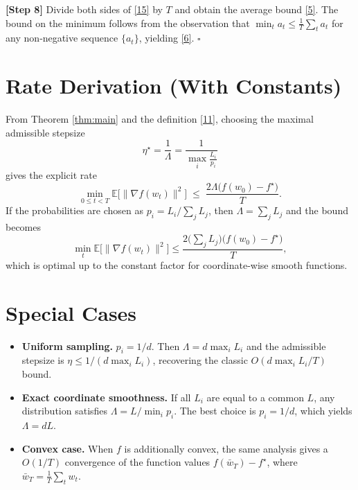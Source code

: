 \documentclass{article}
\newcommand{\E}{\mathbb{E}}
\newcommand{\grad}{\nabla}
\begin{document}
\noindent\textbf{[Step 8]} Divide both sides of \eqref{15} by $T$ and obtain
the average bound \eqref{5}.  The bound on the minimum follows from the
observation that $\min_{t}a_{t}\le\frac{1}{T}\sum_{t}a_{t}$ for any
non‑negative sequence $\{a_{t}\}$, yielding \eqref{6}.  \hfill $\square$

\section*{Rate Derivation (With Constants)}
From Theorem \ref{thm:main} and the definition \eqref{11},
choosing the maximal admissible stepsize
\[
\eta^{\star}=\frac{1}{\Lambda}
=\frac{1}{\displaystyle\max_{i}\frac{L_{i}}{p_{i}}}
\tag{16}
\]
gives the explicit rate
\[
\min_{0\le t<T}\E\!\bigl[\|\grad f(w_{t})\|^{2}\bigr]
\;\le\;
\frac{2\Lambda\bigl(f(w_{0})-f^{\star}\bigr)}{T}.
\tag{17}
\]
If the probabilities are chosen as $p_{i}=L_{i}/\sum_{j}L_{j}$,
then $\Lambda=\sum_{j}L_{j}$ and the bound becomes
\[
\min_{t}\E\!\bigl[\|\grad f(w_{t})\|^{2}\bigr]
\le \frac{2\bigl(\sum_{j}L_{j}\bigr)\bigl(f(w_{0})-f^{\star}\bigr)}{T},
\]
which is optimal up to the constant factor for coordinate‑wise smooth
functions.

\section*{Special Cases}
\begin{itemize}
\item \textbf{Uniform sampling.} $p_{i}=1/d$.
    Then $\Lambda = d\max_{i}L_{i}$ and the admissible stepsize is
    $\eta\le 1/(d\max_{i}L_{i})$, recovering the classic
    $O(d\max_{i}L_{i}/T)$ bound.
\item \textbf{Exact coordinate smoothness.}
    If all $L_{i}$ are equal to a common $L$, any distribution satisfies
    $\Lambda = L/\min_{i}p_{i}$.  The best choice is $p_{i}=1/d$, which yields
    $\Lambda = dL$.
\item \textbf{Convex case.}
    When $f$ is additionally convex, the same analysis gives a
    $O(1/T)$ convergence of the function values
    $f(\bar w_{T})-f^{\star}$, where $\bar w_{T}=\frac{1}{T}\sum_{t}w_{t}$.
\end{itemize}
\end{document}
